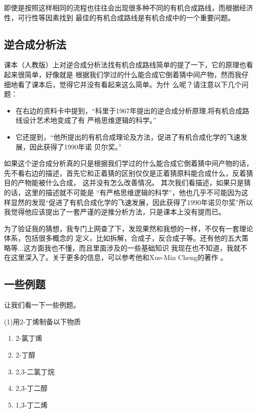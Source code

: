 即使是按照这样相同的流程也往往会出现很多种不同的有机合成路线，而根据经济性，可行性等因素找到
最佳的有机合成路线是有机合成中的一个重要问题。

\subsection{逆合成分析法}
课本（人教版）上对逆合成分析法找有机合成路线简单的提了一下，它的原理也看起来很简单，好像就是
根据我们学过的什么能合成它倒着猜中间产物，然而我仔细地看了课本后，觉得它并没有看起来这么简单。为什
么呢？请注意以下几个问题：
\begin{itemize}
\item 在右边的资料卡中提到，``科里于1967年提出的逆合成分析原理,将有机合成路线设计艺术地变成了有
严格思维逻辑的科学。''
\item 它还提到，``他所提出的有机合成理论及方法，促进了有机合成化学的飞速发展，因此获得了1990年诺
贝尔奖。''
\end{itemize}

如果这个逆合成分析真的只是根据我们学过的什么能合成它倒着猜中间产物的话，
先不看右边的描述，首先它和正着猜的区别仅仅是正着猜原料能合成什么，反着猜目的产物能被什么合成，
这并没有怎么改善情况。
其次我们看描述，如果只是猜的话，这里的描述就不可能是
``有严格思维逻辑的科学''，他也几乎不可能因为这样显然的发现``促进了有机合成化学的飞速发展，因此获得了1990年诺贝尔奖''所以我觉得他应该提出了一套严谨的逆推分析方法，只是课本上没有提而已。

为了验证我的猜想，我专门上网查了下，发现果然和我想的一样，不仅有一套理论体系，包括很多概念的
定义，比如拆解，合成子，反合成子等。还有他的五大策略等...这方面我也不懂，而且里面涉及的一些基础知识
我现在也不知道，我就不在这里深入了。关于更多的信息，可以参考他和Xue-Min Cheng的著作
\cite{ChemSynthesis}。

\subsection{一些例题}
让我们看一下一些例题。

(1)用2-丁烯制备以下物质
\begin{multicols}{3}
\begin{enumerate}[label=(\alph*)]
\item 2-氯丁烯 \item 2-丁醇 \item 2,3-二氯丁烷
\item 2,3-丁二醇 \item 1,3-丁二烯
\end{enumerate}
\end{multicols}

